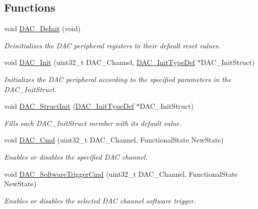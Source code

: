 \subsection*{Functions}
\begin{DoxyCompactItemize}
\item 
void \hyperlink{group___d_a_c_ga1fae225204e1e049d6795319e99ba8bc}{D\+A\+C\+\_\+\+De\+Init} (void)
\begin{DoxyCompactList}\small\item\em Deinitializes the D\+AC peripheral registers to their default reset values. \end{DoxyCompactList}\item 
void \hyperlink{group___d_a_c_ga7c59850468ed4bf0659663fe495441da}{D\+A\+C\+\_\+\+Init} (uint32\+\_\+t D\+A\+C\+\_\+\+Channel, \hyperlink{struct_d_a_c___init_type_def}{D\+A\+C\+\_\+\+Init\+Type\+Def} $\ast$D\+A\+C\+\_\+\+Init\+Struct)
\begin{DoxyCompactList}\small\item\em Initializes the D\+AC peripheral according to the specified parameters in the D\+A\+C\+\_\+\+Init\+Struct. \end{DoxyCompactList}\item 
void \hyperlink{group___d_a_c_gadfc270974d54cb5fa5f92556015c4046}{D\+A\+C\+\_\+\+Struct\+Init} (\hyperlink{struct_d_a_c___init_type_def}{D\+A\+C\+\_\+\+Init\+Type\+Def} $\ast$D\+A\+C\+\_\+\+Init\+Struct)
\begin{DoxyCompactList}\small\item\em Fills each D\+A\+C\+\_\+\+Init\+Struct member with its default value. \end{DoxyCompactList}\item 
void \hyperlink{group___d_a_c_ga323e61530d7fa9396c3bce9edb61f733}{D\+A\+C\+\_\+\+Cmd} (uint32\+\_\+t D\+A\+C\+\_\+\+Channel, Functional\+State New\+State)
\begin{DoxyCompactList}\small\item\em Enables or disables the specified D\+AC channel. \end{DoxyCompactList}\item 
void \hyperlink{group___d_a_c_ga46f9f7f6b9520a86e300fe966afe5fb3}{D\+A\+C\+\_\+\+Software\+Trigger\+Cmd} (uint32\+\_\+t D\+A\+C\+\_\+\+Channel, Functional\+State New\+State)
\begin{DoxyCompactList}\small\item\em Enables or disables the selected D\+AC channel software trigger. \end{DoxyCompactList}\item 

\end{DoxyCompactItemize}
